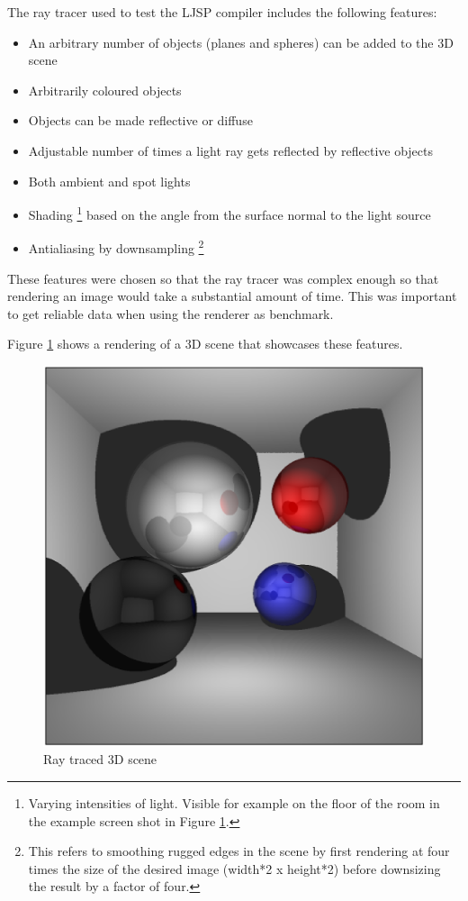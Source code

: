 \documentclass[11pt]{report}
\begin{document}
The ray tracer used to test the LJSP compiler includes the following features:
\begin{itemize}
\item An arbitrary number of objects (planes and spheres) can be added to the 3D scene
\item Arbitrarily coloured objects
\item Objects can be made reflective or diffuse
\item Adjustable number of times a light ray gets reflected by reflective objects
\item Both ambient and spot lights
\item Shading \footnote{Varying intensities of light. Visible for example on the floor of the room in the example screen shot in Figure \ref{raytracerscreenshot}.} based on the angle from the surface normal to the light source
\item Antialiasing by downsampling \footnote{This refers to smoothing rugged edges in the scene by first rendering at four times the size of the desired image (width*2 x height*2) before downsizing the result by a factor of four.} 
\end{itemize}

These features were chosen so that the ray tracer was complex enough so that rendering an image would take a substantial amount of time. This was important to get reliable data when using the renderer as benchmark.

Figure \ref{raytracerscreenshot} shows a rendering of a 3D scene that showcases these features.

\begin{figure}[ht]
\begin{center}
\includegraphics[scale=0.5]{raytracerscreenshot.eps}
\caption{Ray traced 3D scene}
\end{center}
\label{raytracerscreenshot}
\end{figure}
\end{document}
